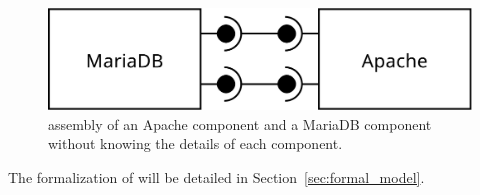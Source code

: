 \begin{figure}[tbp]
  \begin{center}
    \includegraphics[width=0.6\linewidth]{./images/simpleass2.pdf}
  \end{center}
  \caption{\mad assembly of an Apache component and a MariaDB
    component without knowing the details of each component.}
  \label{fig:simple}
\end{figure}

The formalization of \mad will be detailed in
Section~\ref{sec:formal_model}.






